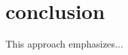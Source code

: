 \chapter{conclusion}
\label{ch:conclusion}

This approach \citep[see][p. 15]{wolff1981social} emphasizes...
